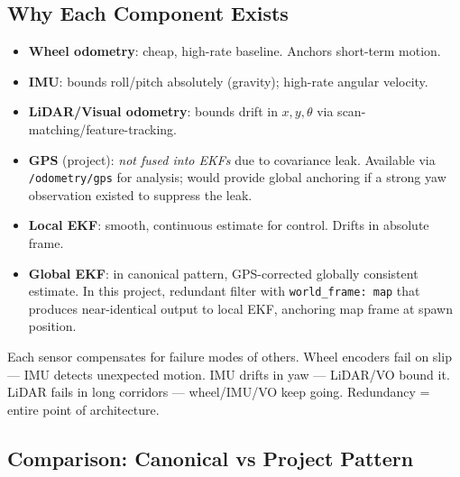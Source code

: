 \documentclass[11pt,a4paper]{article}
\begin{document}
\subsection{Why Each Component Exists}

\begin{itemize}
\item \textbf{Wheel odometry}: cheap, high-rate baseline. Anchors short-term motion.
\item \textbf{IMU}: bounds roll/pitch absolutely (gravity); high-rate angular velocity.
\item \textbf{LiDAR/Visual odometry}: bounds drift in $x, y, \theta$ via scan-matching/feature-tracking.
\item \textbf{GPS} (project): \emph{not fused into EKFs} due to covariance leak. Available via \texttt{/odometry/gps} for analysis; would provide global anchoring if a strong yaw observation existed to suppress the leak.
\item \textbf{Local EKF}: smooth, continuous estimate for control. Drifts in absolute frame.
\item \textbf{Global EKF}: in canonical pattern, GPS-corrected globally consistent estimate. In this project, redundant filter with \texttt{world\_frame: map} that produces near-identical output to local EKF, anchoring map frame at spawn position.
\end{itemize}

Each sensor compensates for failure modes of others. Wheel encoders fail on slip --- IMU detects unexpected motion. IMU drifts in yaw --- LiDAR/VO bound it. LiDAR fails in long corridors --- wheel/IMU/VO keep going. Redundancy = entire point of architecture.

\subsection{Comparison: Canonical vs Project Pattern}
\end{document}
